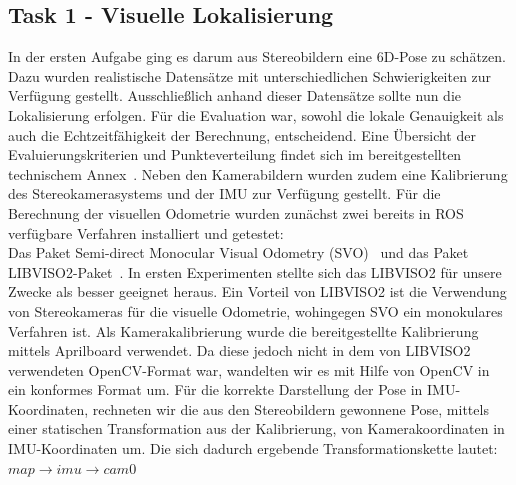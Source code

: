 \documentclass[12pt,titlepage, a4paper]{article}
\begin{document}
\subsection{Task 1 - Visuelle Lokalisierung}
In der ersten Aufgabe ging es darum aus Stereobildern eine 6D-Pose zu schätzen. Dazu wurden realistische Datensätze mit unterschiedlichen Schwierigkeiten zur Verfügung gestellt.
Ausschließlich anhand dieser Datensätze sollte nun die Lokalisierung erfolgen. Für die Evaluation war, sowohl die lokale Genauigkeit als auch die Echtzeitfähigkeit der Berechnung, entscheidend.
Eine Übersicht der Evaluierungskriterien und Punkteverteilung findet sich im bereitgestellten technischem Annex~\cite{eurocannex}.
Neben den Kamerabildern wurden zudem eine Kalibrierung des Stereokamerasystems und der IMU zur Verfügung gestellt. 
Für die Berechnung der visuellen Odometrie wurden zunächst zwei bereits in ROS verfügbare Verfahren installiert und getestet:\\
Das Paket Semi-direct Monocular Visual Odometry (SVO)~\cite{EPFL-CONF-199740} und das Paket \mbox{LIBVISO2}-Paket~\cite{Geiger11}.
In ersten Experimenten stellte sich das \mbox{LIBVISO2} für unsere Zwecke als besser geeignet heraus. Ein Vorteil von LIBVISO2 ist die Verwendung von Stereokameras für die visuelle Odometrie, wohingegen SVO ein monokulares Verfahren ist.
Als Kamerakalibrierung wurde die bereitgestellte Kalibrierung mittels Aprilboard verwendet. Da diese jedoch nicht in dem von \mbox{LIBVISO2} verwendeten OpenCV-Format war, wandelten wir es mit Hilfe von OpenCV
in ein konformes Format um.
Für die korrekte Darstellung der Pose in IMU-Koordinaten, rechneten wir die aus den Stereobildern gewonnene Pose, mittels einer statischen Transformation aus der Kalibrierung, von Kamerakoordinaten 
in IMU-Koordinaten um.
Die sich dadurch ergebende Transformationskette lautet:\\

$  map \rightarrow imu \rightarrow cam0 $\\
\end{document}
